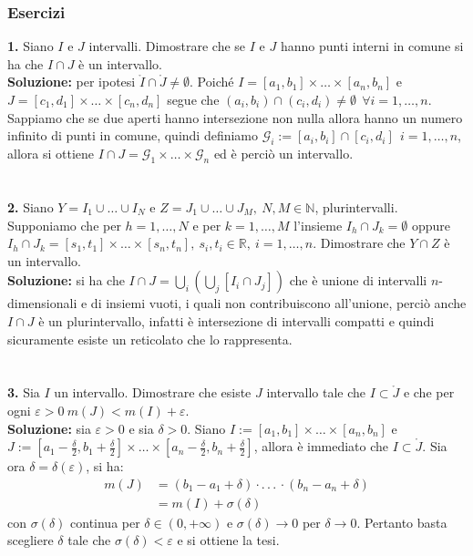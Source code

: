 \documentclass{article}
\numberwithin{equation}{subsection}
\begin{document}
\subsubsection{Esercizi}
\textbf{1.} Siano $I$ e $J$ intervalli. Dimostrare che se $I$ e $J$ hanno punti interni in comune si ha che $I \cap J$ è un intervallo. \\

\textbf{Soluzione:} per ipotesi $\mathring{I} \cap \mathring{J} \neq \emptyset$. Poiché $I = [a_1, b_1] \times \dots \times [a_n, b_n]$ e $J = [c_1, d_1] \times \dots \times [c_n, d_n]$ segue che $(a_i, b_i) \cap (c_i, d_i) \neq \emptyset \ \ \forall i = 1, \dots, n$. Sappiamo che se due aperti hanno intersezione non nulla allora hanno un numero infinito di punti in comune, quindi definiamo $\mathcal{G}_i := [a_i, b_i] \cap [c_i, d_i] \ \ i = 1, \dots, n$, allora si ottiene $I \cap J = \mathcal{G}_1 \times \dots \times \mathcal{G}_n$ ed è perciò un intervallo. \\ \\ \\
\textbf{2.} Siano $Y = I_1 \cup \dots \cup I_N$ e $Z = J_1 \cup \dots \cup J_M, \ N, M \in \mathbb{N}$, plurintervalli. Supponiamo che per $h = 1, \dots, N$ e per $k = 1, \dots, M$ l'insieme $I_h \cap J_k = \emptyset$ oppure $I_h \cap J_k = [s_1, t_1] \times \dots \times [s_n, t_n], \ s_i, t_i \in \mathbb{R}, \ i = 1, \dots, n$. Dimostrare che $Y \cap Z$ è un intervallo. \\

\textbf{Soluzione:} si ha che $I \cap J = \bigcup_i \left( \bigcup_j \left[ I_i \cap J_j \right] \right)$ che è unione di intervalli $n$-dimensionali e di insiemi vuoti, i quali non contribuiscono all'unione, perciò anche $I \cap J$ è un plurintervallo, infatti è intersezione di intervalli compatti e quindi sicuramente esiste un reticolato che lo rappresenta. \\ \\ \\
\textbf{3.} Sia $I$ un intervallo. Dimostrare che esiste $J$ intervallo tale che  $I \subset \mathring{J}$ e che per ogni $\varepsilon > 0 \ m(J) < m(I) + \varepsilon$. \\

\textbf{Soluzione:} sia $\varepsilon > 0$ e sia $\delta > 0$. Siano $I := [a_1, b_1] \times \dots \times [a_n, b_n]$ e \\$J := [a_1 - \frac{\delta}{2}, b_1 + \frac{\delta}{2}] \times \dots \times [a_n - \frac{\delta}{2}, b_n + \frac{\delta}{2}]$, allora è immediato che $I \subset \mathring{J}$. Sia ora $\delta = \delta(\varepsilon)$, si ha:
\begin{align*}
    m(J) &= (b_1 - a_1 + \delta) \cdot .\, .\, .\, \cdot (b_n - a_n + \delta) \\
    &= m(I) + \sigma (\delta)
\end{align*}
con $\sigma(\delta)$ continua per $\delta \in (0, + \infty)$ e $\sigma(\delta) \rightarrow 0$ per $\delta \rightarrow 0$. Pertanto basta scegliere $\delta$ tale che $\sigma(\delta) < \varepsilon$ e si ottiene la tesi. \newpage
\end{document}
